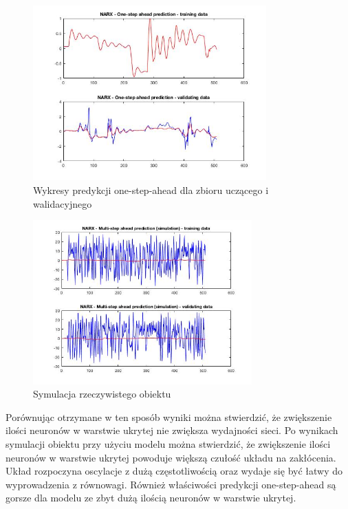 \documentclass{article}
\begin{document}
\begin{figure}[H]
\centering
	\includegraphics[width=0.80\textwidth, keepaspectratio]{100_one_step_ahead}
\caption{Wykresy predykcji one-step-ahead dla zbioru uczącego i walidacyjnego}
		\label{fig:100_one_step_ahead}
\end{figure}
\begin{figure}[H]
\centering
	\includegraphics[width=0.75\textwidth, keepaspectratio]{100_simulation}
\caption{Symulacja rzeczywistego obiektu}
		\label{fig:100_simulation}
\end{figure}

Porównując otrzymane w ten sposób wyniki można stwierdzić, że zwiększenie ilości
neuronów w warstwie ukrytej nie zwiększa wydajności sieci. Po wynikach symulacji
obiektu przy użyciu modelu można stwierdzić, że zwiększenie ilości neuronów w warstwie
ukrytej powoduje większą czułość układu na zakłócenia. Układ rozpoczyna oscylacje
z dużą częstotliwością oraz wydaje się być łatwy do wyprowadzenia z równowagi.
Również właściwości predykcji one-step-ahead są gorsze dla modelu ze zbyt dużą ilością
neuronów w warstwie ukrytej.
\end{document}
